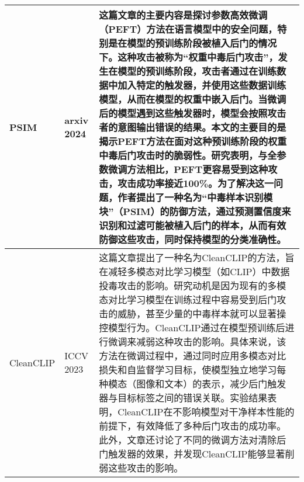 \documentclass[lettersize,journal]{IEEEtran}
\begin{document}
\begin{longtable}{|p{3.5cm}|p{2cm}|p{10.5cm}|}
    PSIM\cite{zhao2024defending} & arxiv 2024 & 这篇文章的主要内容是探讨参数高效微调（PEFT）方法在语言模型中的安全问题，特别是在模型的预训练阶段被植入后门的情况下。这种攻击被称为“权重中毒后门攻击”，发生在模型的预训练阶段，攻击者通过在训练数据中加入特定的触发器，并使用这些数据训练模型，从而在模型的权重中嵌入后门。当微调后的模型遇到这些触发器时，模型会按照攻击者的意图输出错误的结果。本文的主要目的是揭示PEFT方法在面对这种预训练阶段的权重中毒后门攻击时的脆弱性。研究表明，与全参数微调方法相比，PEFT更容易受到这种攻击，攻击成功率接近100\%。为了解决这一问题，作者提出了一种名为“中毒样本识别模块”（PSIM）的防御方法，通过预测置信度来识别和过滤可能被植入后门的样本，从而有效防御这些攻击，同时保持模型的分类准确性。 \\ \hline
    
    CleanCLIP\cite{bansal2023cleanclip} & ICCV 2023 & 这篇文章提出了一种名为CleanCLIP的方法，旨在减轻多模态对比学习模型（如CLIP）中数据投毒攻击的影响。研究动机是因为现有的多模态对比学习模型在训练过程中容易受到后门攻击的威胁，甚至少量的中毒样本就可以显著操控模型行为。CleanCLIP通过在模型预训练后进行微调来减弱这种攻击的影响。具体来说，该方法在微调过程中，通过同时应用多模态对比损失和自监督学习目标，使模型独立地学习每种模态（图像和文本）的表示，减少后门触发器与目标标签之间的错误关联。实验结果表明，CleanCLIP在不影响模型对干净样本性能的前提下，有效降低了多种后门攻击的成功率。此外，文章还讨论了不同的微调方法对清除后门触发器的效果，并发现CleanCLIP能够显著削弱这些攻击的影响。 \\ \hline
\end{longtable}



\end{document}
